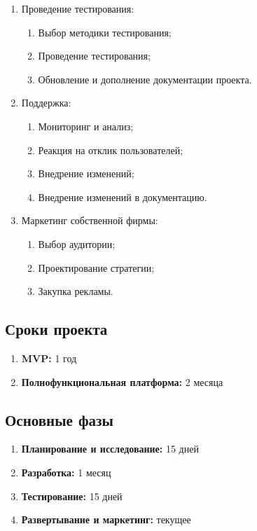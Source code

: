 \documentclass[14pt, russian]{matmex-diploma-custom}
\begin{document}
\begin{enumerate}
    \item Проведение тестирования:
    \begin{enumerate}
        \item Выбор методики тестирования;
        \item Проведение тестирования;
        \item Обновление и дополнение документации проекта.
    \end{enumerate}

    \item Поддержка:
    \begin{enumerate}
        \item Мониторинг и анализ;
        \item Реакция на отклик пользователей;
        \item Внедрение изменений;
        \item Внедрение изменений в документацию.
    \end{enumerate}

    \item Маркетинг собственной фирмы:
    \begin{enumerate}
        \item Выбор аудитории;
        \item Проектирование стратегии;
        \item Закупка рекламы.
    \end{enumerate}

\end{enumerate}

\subsection{Сроки проекта}
\begin{enumerate}
    \item \textbf{MVP:} 1 год
    \item \textbf{Полнофункциональная платформа:} 2 месяца
\end{enumerate}

\subsection{Основные фазы}
\begin{enumerate}
    \item \textbf{Планирование и исследование:} 15 дней
    \item \textbf{Разработка:} 1 месяц
    \item \textbf{Тестирование:} 15 дней
    \item \textbf{Развертывание и маркетинг:} текущее
\end{enumerate}
\end{document}
